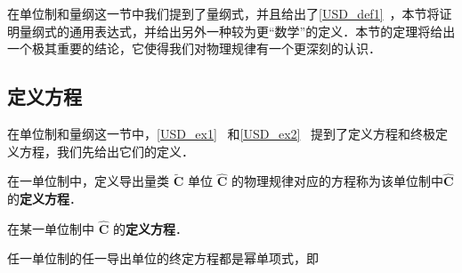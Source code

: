 
在单位制和量纲这一节中我们提到了量纲式，并且给出了\autoref{USD_def1}~，本节将证明量纲式的通用表达式，并给出另外一种较为更“数学”的定义．本节的定理将给出一个极其重要的结论，它使得我们对物理规律有一个更深刻的认识．
\subsection{定义方程}
在单位制和量纲这一节中，\autoref{USD_ex1}~ 和\autoref{USD_ex2}~ 提到了定义方程和终极定义方程，我们先给出它们的定义．
\begin{definition}{}
在一单位制中，定义导出量类 $\tilde{\boldsymbol{C}}$ 单位 $\hat{\boldsymbol{C}}$ 的物理规律对应的方程称为该单位制中$\hat{\boldsymbol{C}}$ 的\textbf{定义方程}．
\end{definition}
\begin{definition}{}
在某一单位制中 $\hat{\boldsymbol{C}}$ 的\textbf{定义方程}．
\end{definition}

\begin{theorem}{}
任一单位制的任一导出单位的终定方程都是幂单项式，即
\end{theorem}